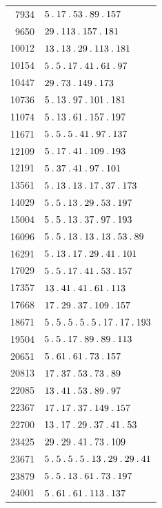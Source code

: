 \begin{longtable}{@{}r|l@{}}
7934 & $5\pdot 17\pdot 53\pdot 89\pdot 157$\\
9650 & $29\pdot 113\pdot 157\pdot 181$\\
10012 & $13\pdot 13\pdot 29\pdot 113\pdot 181$\\
10154 & $5\pdot 5\pdot 17\pdot 41\pdot 61\pdot 97$\\
10447 & $29\pdot 73\pdot 149\pdot 173$\\
10736 & $5\pdot 13\pdot 97\pdot 101\pdot 181$\\
11074 & $5\pdot 13\pdot 61\pdot 157\pdot 197$\\
11671 & $5\pdot 5\pdot 5\pdot 41\pdot 97\pdot 137$\\
12109 & $5\pdot 17\pdot 41\pdot 109\pdot 193$\\
12191 & $5\pdot 37\pdot 41\pdot 97\pdot 101$\\
13561 & $5\pdot 13\pdot 13\pdot 17\pdot 37\pdot 173$\\
14029 & $5\pdot 5\pdot 13\pdot 29\pdot 53\pdot 197$\\
15004 & $5\pdot 5\pdot 13\pdot 37\pdot 97\pdot 193$\\
16096 & $5\pdot 5\pdot 13\pdot 13\pdot 13\pdot 53\pdot 89$\\
16291 & $5\pdot 13\pdot 17\pdot 29\pdot 41\pdot 101$\\
17029 & $5\pdot 5\pdot 17\pdot 41\pdot 53\pdot 157$\\
17357 & $13\pdot 41\pdot 41\pdot 61\pdot 113$\\
17668 & $17\pdot 29\pdot 37\pdot 109\pdot 157$\\
18671 & $5\pdot 5\pdot 5\pdot 5\pdot 5\pdot 17\pdot 17\pdot 193$\\
19504 & $5\pdot 5\pdot 17\pdot 89\pdot 89\pdot 113$\\
20651 & $5\pdot 61\pdot 61\pdot 73\pdot 157$\\
20813 & $17\pdot 37\pdot 53\pdot 73\pdot 89$\\
22085 & $13\pdot 41\pdot 53\pdot 89\pdot 97$\\
22367 & $17\pdot 17\pdot 37\pdot 149\pdot 157$\\
22700 & $13\pdot 17\pdot 29\pdot 37\pdot 41\pdot 53$\\
23425 & $29\pdot 29\pdot 41\pdot 73\pdot 109$\\
23671 & $5\pdot 5\pdot 5\pdot 5\pdot 13\pdot 29\pdot 29\pdot 41$\\
23879 & $5\pdot 5\pdot 13\pdot 61\pdot 73\pdot 197$\\
24001 & $5\pdot 61\pdot 61\pdot 113\pdot 137$\\

\end{longtable}
